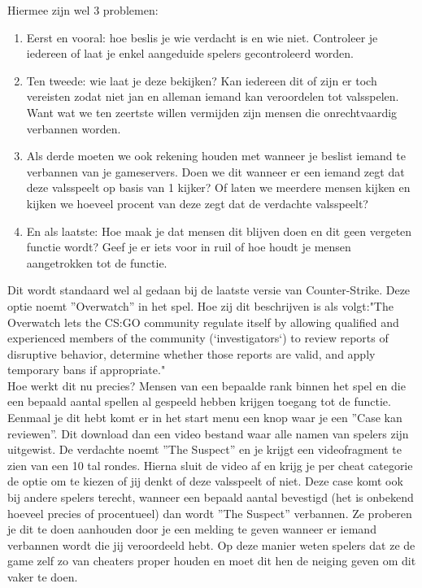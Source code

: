 \documentclass[pdftex,a4paper,12pt,twoside]{report}
\begin{document}
Hiermee zijn wel 3 problemen:
\begin{enumerate}  
\item Eerst en vooral: hoe beslis je wie verdacht is en wie niet. Controleer je iedereen of laat je enkel aangeduide spelers gecontroleerd worden.
\item Ten tweede: wie laat je deze bekijken? Kan iedereen dit of zijn er toch vereisten zodat niet jan en alleman iemand kan veroordelen tot valsspelen. Want wat we ten zeertste willen vermijden zijn mensen die onrechtvaardig verbannen worden.
\item Als derde moeten we ook rekening houden met wanneer je beslist iemand te verbannen van je gameservers. Doen we dit wanneer er een iemand zegt dat deze valsspeelt op basis van 1 kijker? Of laten we meerdere mensen kijken en kijken we hoeveel procent van deze zegt dat de verdachte valsspeelt?
\item En als laatste: Hoe maak je dat mensen dit blijven doen en dit geen vergeten functie wordt? Geef je er iets voor in ruil of hoe houdt je mensen aangetrokken tot de functie.
\end{enumerate}

Dit wordt standaard wel al gedaan bij de laatste versie van Counter-Strike. Deze optie noemt ''Overwatch'' in het spel.
Hoe zij dit beschrijven is als volgt:"The Overwatch lets the CS:GO community regulate itself by allowing qualified and experienced members of the community (‘investigators‘) to review reports of disruptive behavior, determine whether those reports are valid, and apply temporary bans if appropriate." \citep{overwatch}
\\

Hoe werkt dit nu precies? Mensen van een bepaalde rank binnen het spel en die een bepaald aantal spellen al gespeeld hebben krijgen toegang tot de functie. Eenmaal je dit hebt komt er in het start menu een knop waar je een ''Case kan reviewen''. Dit download dan een video bestand waar alle namen van spelers zijn uitgewist. De verdachte noemt ''The Suspect'' en je krijgt een videofragment te zien van een 10 tal rondes. Hierna sluit de video af en krijg je per cheat categorie de optie om te kiezen of jij denkt of deze valsspeelt of niet. Deze case komt ook bij andere spelers terecht, wanneer een bepaald aantal bevestigd (het is onbekend hoeveel precies of procentueel) dan wordt ''The Suspect'' verbannen. Ze proberen je dit te doen aanhouden door je een melding te geven wanneer er iemand verbannen wordt die jij veroordeeld hebt. Op deze manier weten spelers dat ze de game zelf zo van cheaters proper houden en moet dit hen de neiging geven om dit vaker te doen.
\\
\end{document}
